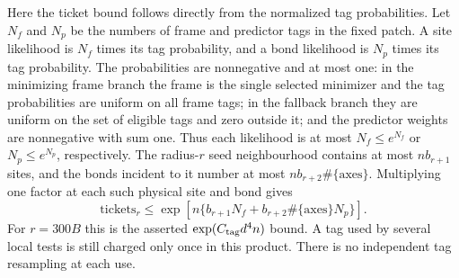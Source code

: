 Here the ticket bound follows directly from the normalized tag
probabilities. Let $N_f$ and $N_p$ be the numbers of frame and
predictor tags in the fixed patch. A site likelihood is $N_f$ times
its tag probability, and a bond likelihood is $N_p$ times its tag
probability. The probabilities are nonnegative and at most one:
in the minimizing frame branch the frame is the single selected
minimizer and the tag probabilities are uniform on all frame tags;
in the fallback branch they are uniform on the set of eligible tags
and zero outside it; and the predictor weights are nonnegative with
sum one.
Thus each likelihood is at most $N_f\le e^{N_f}$ or
$N_p\le e^{N_p}$, respectively. The radius-$r$ seed neighbourhood
contains at most $n b_{r+1}$ sites, and the bonds incident to it
number at most $n b_{r+2}\#\{\mathrm{axes}\}$. Multiplying one
factor at each such physical site and bond gives
\[
 \mathrm{tickets}_r\le
 \exp\!\left[n\{b_{r+1}N_f+
 b_{r+2}\#\{\mathrm{axes}\}N_p\}\right].
\]
For $r=300B$ this is the asserted $\exp(C_{\rm tag}d^4n)$
bound. A tag used by several local tests is still charged only once
in this product. There is no independent tag resampling at each use.

